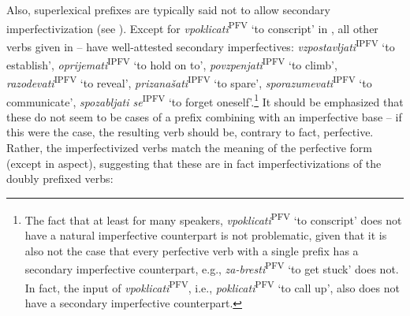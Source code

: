 \documentclass[output=paper,colorlinks,citecolor=brown]{langscibook}
\begin{document}
Also, superlexical prefixes are typically said not to allow secondary imperfectivization (see ). Except for \textit{vpoklicati}\textsuperscript{PFV} `to conscript' in , all other verbs given in -- have well-attested secondary imperfectives: \textit{vzpostavljati}\textsuperscript{IPFV} `to establish', \textit{oprijemati}\textsuperscript{IPFV} `to hold on to', \textit{povzpenjati}\textsuperscript{IPFV} `to climb',  \textit{razodevati}\textsuperscript{IPFV} `to reveal', \textit{prizanašati}\textsuperscript{IPFV} `to spare', \textit{sporazumevati}\textsuperscript{IPFV} `to communicate', \textit{spozabljati se}\textsuperscript{IPFV} `to forget oneself'.\footnote{The fact that at least for many speakers, \textit{vpoklicati}\textsuperscript{PFV} `to conscript' does not have a natural imperfective counterpart is not problematic, given that it is also not the case that every perfective verb with a single prefix has a secondary imperfective counterpart, e.g., \textit{za-bresti}\textsuperscript{PFV} `to get stuck' does not. In fact, the input of \textit{vpoklicati}\textsuperscript{PFV}, i.e., \textit{poklicati}\textsuperscript{PFV} `to call up', also does not have a secondary imperfective counterpart.} It should be emphasized that these do not seem to be cases of a prefix combining with an imperfective base -- if this were the case, the resulting verb should be, contrary to fact, perfective. Rather, the imperfectivized verbs match the meaning of the perfective form (except in aspect), suggesting that these are in fact imperfectivizations of the doubly prefixed verbs:

 \ea \label{ex:zanestipfv} 
\z \z 


 \ea \label{ex:prizanestipfv} 
\z \z 
\end{document}
